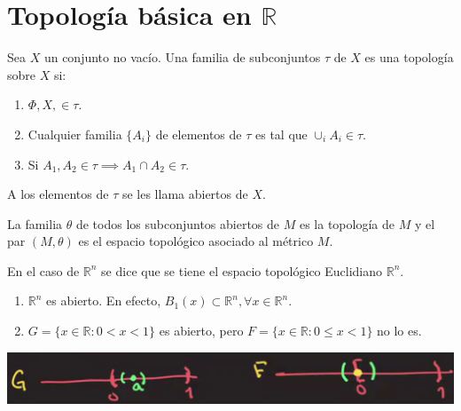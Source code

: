 \section{Topología básica en $\mathbb{R}$}

\begin{definicion}
	Sea $X$ un conjunto no vacío. Una familia de subconjuntos $\tau$ de $X$ es una topología sobre $X$ si: 
	\begin{enumerate}
		\item $\Phi, X, \in \tau$. 
		\item Cualquier familia $\{A_i\}$ de elementos de $\tau$ es tal que $\cup_i A_i\in\tau$. 
		\item Si $A_1,A_2\in \tau \implies A_1\cap A_2 \in \tau$. 
	\end{enumerate}
\begin{nota}
	A los elementos de $\tau$ se les llama abiertos de $X$. 
\end{nota}
\end{definicion}

\begin{definicion}
	La familia $\theta$ de todos los subconjuntos abiertos de $M$ es la topología de $M$ y el par $(M, \theta)$ es el espacio topológico asociado al métrico $M$.
	\begin{nota}
		En el caso de $\mathbb{R}^n$ se dice que se tiene el espacio topológico Euclidiano $\mathbb{R}^n$. 
	\end{nota}
\end{definicion}

\begin{ejemplo}
	\begin{enumerate}
		\item $\mathbb{R}^n$ es abierto. En efecto, $B_1(x)\subset \mathbb{R}^n, \forall x\in\mathbb{R}^n$. 
		\item $G=\{x\in\mathbb{R}:0<x<1\}$ es abierto,  pero $F=\{x\in\mathbb{R}:0\leq x<1\}$ no lo es. 
	\end{enumerate}

\begin{center}
	\includegraphics[scale=0.4]{images/2/1}
\end{center}
\end{ejemplo}


